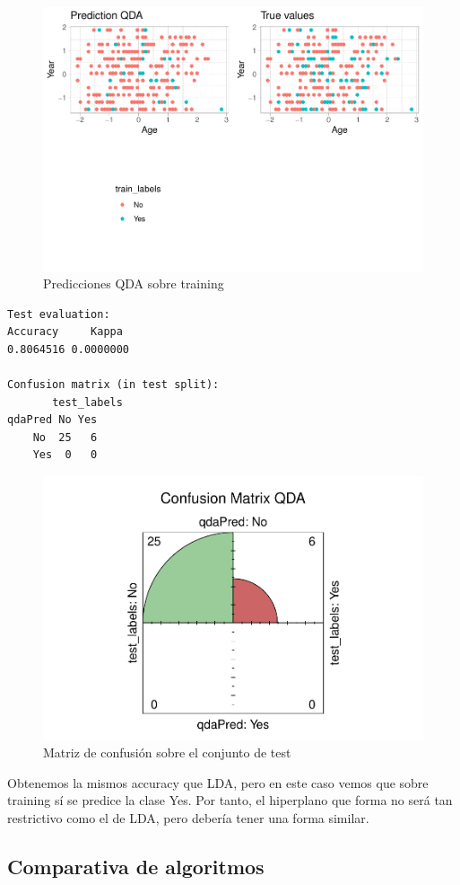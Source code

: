 \begin{figure}[H]\center\includegraphics[width=.78\linewidth]{img/Clasificacion_files/figure-latex/unnamed-chunk-30-1}\caption{Predicciones QDA sobre training}\end{figure}


\begin{verbatim}
Test evaluation:
Accuracy     Kappa 
0.8064516 0.0000000

Confusion matrix (in test split):
       test_labels
qdaPred No Yes
    No  25   6
    Yes  0   0
\end{verbatim}

\begin{figure}[H]\center\includegraphics[width=.75\linewidth]{img/Clasificacion_files/figure-latex/unnamed-chunk-29-1}\caption{Matriz de confusión sobre el conjunto de test}\end{figure}

Obtenemos la mismos accuracy que LDA, pero en este caso vemos que sobre training sí se predice la clase Yes. Por tanto, el hiperplano que forma no será tan restrictivo como el de LDA, pero debería tener una forma similar.

\subsection{Comparativa de algoritmos}
